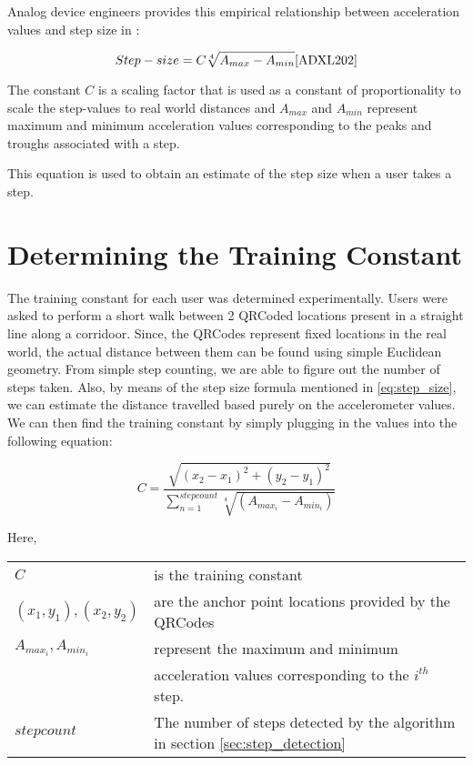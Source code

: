 Analog device engineers provides this empirical relationship between acceleration
values and step size in \cite{ADXL202}:

\begin{equation}\label{eq:step_size}
 Step-size = C \sqrt[4]{A_{max} - A_{min}} \cite{ADXL202}
\end{equation}

The constant $C$ is a scaling factor that is used as a constant of proportionality
to scale the step-values to real world distances and $A_{max}$ and $A_{min}$
represent maximum and minimum acceleration values corresponding to the 
peaks and troughs associated with a step. 

This equation is used to obtain an estimate of the step size when a user 
takes a step.

\section{Determining the Training Constant}

The training constant for each user was determined experimentally. 
Users were asked to perform a short walk between 2 QRCoded locations
present in a straight line along a corridoor.
Since, the QRCodes represent fixed locations in the real world, the actual 
distance between them can be found using simple Euclidean geometry. From 
simple step counting, we are able to figure out the number of steps taken.
Also, by means of the step size formula mentioned in \eqref{eq:step_size},
we can estimate the distance travelled based purely on the accelerometer
values. We can then find the training constant by simply plugging in 
the values into the following equation:

\begin{equation}
C=\frac{\sqrt{(x_{2}-x_{1})^{2}+(y_{2}-y_{1})^{2}}}{\sum_{n=1}^{stepcount}\sqrt[4]{(A_{max_{i}}-A_{min_{i}})}}
\end{equation}

Here,\\
\begin{tabular}{l l}
$C$                         & is the training constant   \\
$(x_1, y_1), (x_2, y_2)$    & are the anchor point locations provided by the QRCodes \\
$A_{max_{i}}, A_{min_{i}}$  & represent the maximum and minimum \\
                            & acceleration values corresponding to the $i^{th}$ step.\\
$stepcount$                 & The number of steps detected by the algorithm in section \ref{sec:step_detection} \\
\end{tabular}



